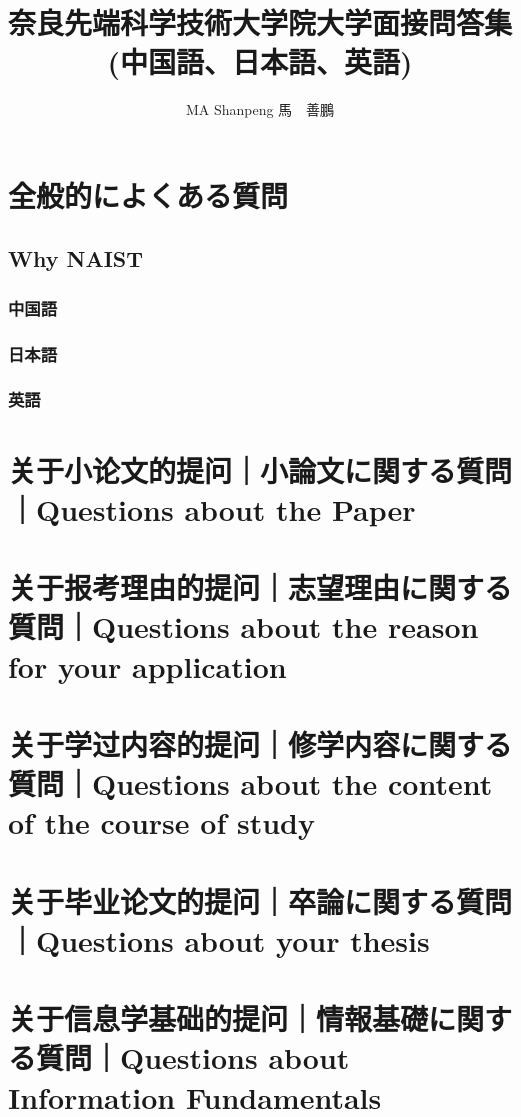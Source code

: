\documentclass[lang=cn,11pt,a4paper]{elegantpaper}
\title{奈良先端科学技術大学院大学面接問答集\\(中国語、日本語、英語)}
\author{MA Shanpeng 馬　善鵬}
\institute{\href{https://inusturbo.github.io/}{個人ホームページ}}
\date{\zhtoday}
\begin{document}
\maketitle

\begin{abstract}


\end{abstract}

 \tableofcontents
 \newpage
\section{全般的によくある質問}
\subsection{Why NAIST}
\subsubsection{中国語}
\subsubsection{日本語}
\subsubsection{英語}
\section{关于小论文的提问｜小論文に関する質問｜Questions about the Paper}

\section{关于报考理由的提问｜志望理由に関する質問｜Questions about the reason for your application}

\section{关于学过内容的提问｜修学内容に関する質問｜Questions about the content of the course of study}

\section{关于毕业论文的提问｜卒論に関する質問｜Questions about your thesis}

\section{关于信息学基础的提问｜情報基礎に関する質問｜Questions about Information Fundamentals}
\end{document}
